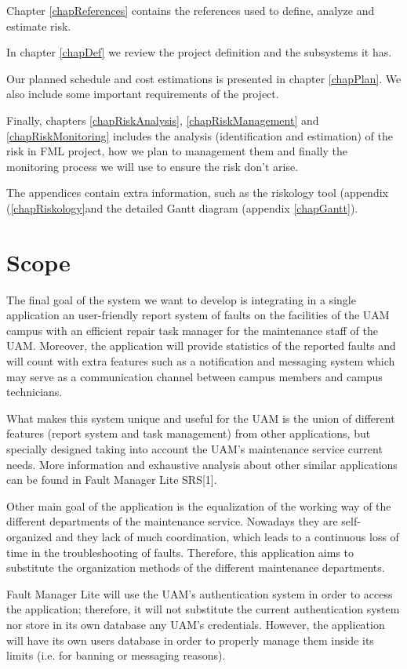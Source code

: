 \documentclass[11pt]{report}
\begin{document}
Chapter \ref{chapReferences} contains the references used to define, analyze and estimate risk.

In chapter \ref{chapDef} we review the project definition and the subsystems it has.

Our planned schedule and cost estimations is presented in chapter \ref{chapPlan}. We also include some important requirements of the project.


Finally, chapters \ref{chapRiskAnalysis}, \ref{chapRiskManagement} and \ref{chapRiskMonitoring} includes the analysis (identification and estimation) of the risk in FML project, how we plan to management them and finally the monitoring process we will use to ensure the risk don't arise.

The appendices contain extra information, such as the riskology tool (appendix (\ref{chapRiskology}and the detailed Gantt diagram (appendix \ref{chapGantt}).

\section{Scope}

The final goal of the system we want to develop is integrating in a single application an user-friendly report system of faults on the facilities of the UAM campus with an efficient repair task manager for the maintenance staff of the UAM. Moreover, the application will provide statistics of the reported faults and will count with extra features such as a notification and messaging system which may serve as a communication channel between campus members and campus technicians.

What makes this system unique and useful for the UAM is the union of different features (report system and task management) from other applications, but specially designed taking into account the UAM's maintenance service current needs. More information and exhaustive analysis about other similar applications can be found in Fault Manager Lite SRS[1].

Other main goal of the application is the equalization of the working way of the different departments of the maintenance service. Nowadays they are self-organized and they lack of much coordination, which leads to a continuous loss of time in the troubleshooting of faults. Therefore, this application aims to substitute the organization methods of the different maintenance departments.

Fault Manager Lite will use the UAM's authentication system in order to access the application; therefore, it will not substitute the current authentication system nor store in its own database any UAM's credentials. However, the application will have its own users database in order to properly manage them inside its limits (i.e. for banning or messaging reasons).
\end{document}
